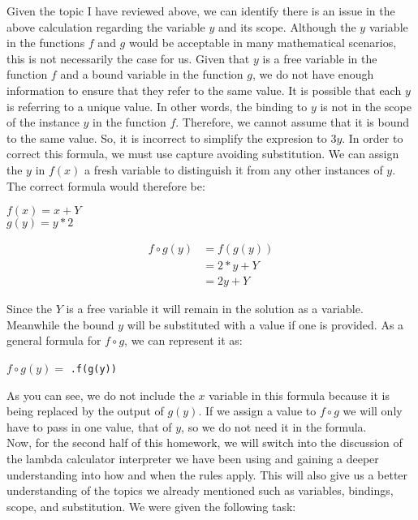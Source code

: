 \documentclass{article}
\theoremstyle{theorem}
\theoremstyle{definition}
\theoremstyle{remark}
\begin{document}
Given the topic I have reviewed above, we can identify there is an issue in the above calculation regarding the variable $y$ and its scope. Although the $y$ variable in the functions $f$ and $g$ would be acceptable in many mathematical scenarios, this is 
not necessarily the case for us. Given that $y$ is a free variable in the function $f$ and a bound variable in the function $g$, we do not have enough information to ensure that they refer to the same value. It is possible that each $y$ is referring to 
a unique value. In other words, the binding to $y$ is not in the scope of the instance $y$ in the function $f$. Therefore, we cannot assume that it is bound to the same value. So, it is incorrect to simplify the expresion to $3y$. In order to correct this formula, 
we must use capture avoiding substitution. We can assign the $y$ in $f(x)$ a fresh variable to distinguish it from any other instances of $y$. The correct formula would therefore be: \\
\begin{center}
  $f(x) = x + Y$\\
  $g(y) = y * 2$

  \begin{align*}
    f \circ g(y) & = f(g(y)) \\
                & = 2 * y + Y \\
                & = 2y + Y
  \end{align*}
\end{center}
Since the $Y$ is a free variable it will remain in the solution as a variable. Meanwhile the bound $y$ will be substituted with a value if one is provided. As a general formula for $f \circ g$, we can represent it as: 
\begin{center}
  $f \circ g(y) = $ \texttt{\y.f(g(y))}
\end{center} 
As you can see, we do not include the $x$ variable in this formula because it is being replaced by the output of $g(y)$. If we assign a value to $f \circ g$ we will only have to pass in one value, that of $y$, so we do not need it in the formula. \\



Now, for the second half of this homework, we will switch into the discussion of the lambda calculator interpreter we have been using and gaining a deeper understanding into how and when the rules apply. This will also give us a better understanding of the topics we already 
mentioned such as variables, bindings, scope, and substitution. We were given the following task:\\
\end{document}

